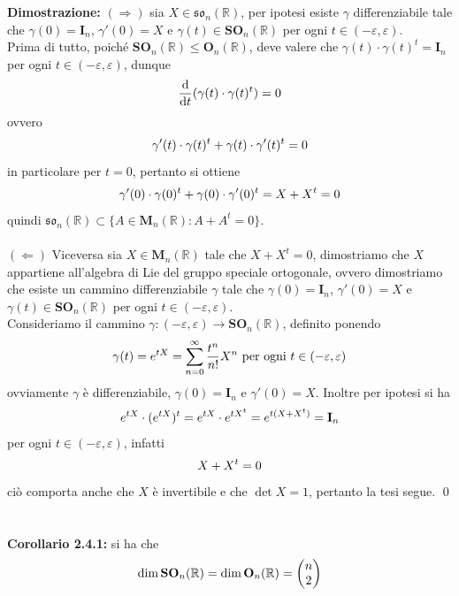 \documentclass{article}
\begin{document}
\textbf{Dimostrazione:} $(\Rightarrow)$ sia $X \in \mathfrak{so}_n(\mathbb{R})$, per ipotesi esiste $\gamma$ differenziabile tale che $\gamma(0) = \mathbf{I}_n$, $\gamma'(0) = X$ e $\gamma(t) \in \mathbf{SO}_n(\mathbb{R})$ per ogni $t \in (-\varepsilon, \varepsilon)$. \\
Prima di tutto, poiché $\mathbf{SO}_n(\mathbb{R}) \leq \mathbf{O}_n(\mathbb{R})$, deve valere che $\gamma(t) \cdot \gamma(t)^t = \mathbf{I}_n$ per ogni $t \in (-\varepsilon, \varepsilon)$, dunque
\begin{gather}
    \frac{\mathrm{d}}{\mathrm{d}t} (\gamma(t) \cdot \gamma(t)^t) = 0 \notag
\end{gather}
ovvero
\begin{gather}
    \gamma'(t) \cdot \gamma(t)^t + \gamma(t) \cdot \gamma'(t)^t = 0 \notag
\end{gather}
in particolare per $t = 0$, pertanto si ottiene
\begin{gather}
    \gamma'(0) \cdot \gamma (0)^t + \gamma(0) \cdot \gamma'(0)^t = X + X^t = 0 \notag
\end{gather}
quindi $\mathfrak{so}_n(\mathbb{R}) \subset \{ A \in \mathbf{M}_n(\mathbb{R}) : A + A^t = 0 \}$. \\ \\
$(\Leftarrow)$ Viceversa sia $X \in \mathbf{M}_n(\mathbb{R})$ tale che $X + X^t = 0$, dimostriamo che $X$ appartiene all'algebra di Lie del gruppo speciale ortogonale, ovvero dimostriamo che esiste un cammino differenziabile $\gamma$ tale che $\gamma(0) = \mathbf{I}_n$, $\gamma'(0) = X$ e $\gamma(t) \in \mathbf{SO}_n(\mathbb{R})$ per ogni $t \in (-\varepsilon, \varepsilon)$. \\
Consideriamo il cammino $\gamma : (-\varepsilon, \varepsilon) \longrightarrow \mathbf{SO}_n(\mathbb{R})$, definito ponendo
\begin{gather}
    \gamma(t) = e^{tX} = \sum_{n = 0}^\infty \frac{t^n}{n!}X^n \text{ per ogni } t \in (-\varepsilon, \varepsilon) \notag
\end{gather}
ovviamente $\gamma$ è differenziabile, $\gamma(0) = \mathbf{I}_n$ e $\gamma'(0) = X$. Inoltre per ipotesi si ha
\begin{gather}
    e^{tX} \cdot (e^{tX})^t = e^{tX} \cdot e^{tX^t} = e^{t(X + X^t)} = \mathbf{I}_n \notag
\end{gather}
per ogni $t \in (-\varepsilon, \varepsilon)$, infatti
\begin{gather}
    X + X^t = 0 \notag
\end{gather}
ciò comporta anche che $X$ è invertibile e che $\det X = 1$, pertanto la tesi segue. \qed \\ \\ \\
\textbf{Corollario 2.4.1:} si ha che
\begin{gather}
    \dim \mathbf{SO}_n(\mathbb{R}) = \dim \mathbf{O}_n(\mathbb{R}) = \begin{pmatrix}
        n \\
        2
    \end{pmatrix} \notag
\end{gather}
\end{document}
